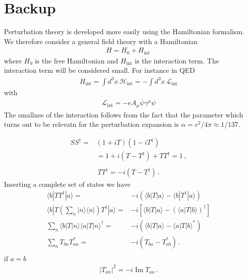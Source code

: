 \section{Backup}
\label{sec:backup}

Perturbation theory is developed more easily using the Hamiltonian formalism. We therefore consider a general field theory with a Hamiltonian
\begin{align}
  \label{eq:75}
  H=H_0+H_{\text{int}}\,
\end{align}
where $H_0$ is the free Hamiltonian and $H_{\text{int}}$ is the interaction term. The interaction term will be considered small. For instance in QED
\begin{align}
  H_{\text{int}}=\int d^3x\,\mathcal{H}_{\text{int}}=-\int d^3x\,\mathcal{L}_{\text{int}}
\end{align}
with
\begin{align}
  \mathcal{L}_{\text{int}}=-e A_\mu\overline{\psi}\gamma^\mu\psi
\end{align}
The smallnes of the interaction follows from the fact that the parameter which turns out to be relevatn for the perturbation expansion is $\alpha=e^2/4\pi\approx1/137$.


\begin{align}
  S S^\dagger=&(1+i T)(1-i T^\dagger)\nonumber\\
  &=1+i(T-T^\dagger)+T T^\dagger=1\,,\nonumber\\
\end{align}
\begin{align}
  T T^\dagger=-i(T-T^\dagger)\,.
\end{align}
Inserting a complete set of states we have
\begin{align}
  \langle b|T T^\dagger|a\rangle=&-i(\langle b|T|a\rangle-\langle b|T^\dagger|a\rangle)\nonumber\\
\langle b|T\left(\sum_n|n\rangle\langle n|\right)T^\dagger|a\rangle=&-i\left[\langle b|T|a\rangle-\left(\langle a|T|b\rangle\right)^\dagger\right]\nonumber\\
\sum_n\langle b|T|n\rangle\langle a|T|n\rangle^\dagger=&-i\left(\langle b|T|a\rangle-\langle a|T|b\rangle^*\right)\nonumber\\
\sum_n T_{bn}T_{an}^*=&-i\left(T_{ba}-T_{ab}^*\right)\,.\nonumber\\
\end{align}
if $a=b$
\begin{align}
  |T_{an}|^2=-i\operatorname{Im}T_{aa} \,.
\end{align}

